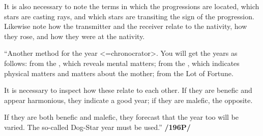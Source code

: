 It is also necessary to note the terms in which the progressions are located, which stars are casting rays, and which stars are transiting the sign of the progression. Likewise note how the transmitter and the receiver relate to the nativity, how they rose, and how they were at the nativity.

“Another method for the year <=chronocrator>. You will get the years as follows: from the \Sun, which reveals mental matters; from the \Moon, which indicates physical matters and matters about the mother; from the Lot of Fortune. 

It is necessary to inspect how these relate to each other. If they are benefic and appear harmonious, they indicate a good year; if they are malefic, the opposite. 

If they are both benefic and malefic, they forecast that the year too will be varied. The so-called Dog-Star year must be used.” \textbf{/196P/}

\newpage